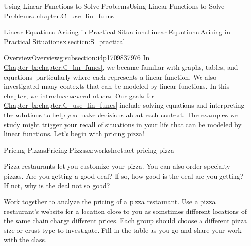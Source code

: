 \documentclass[oneside,10pt,]{book}
\newcommand{\xreffont}{\relax}
\numberwithin{equation}{chapter}
\begin{document}
\begin{chapterptx}{Using Linear Functions to Solve Problems}{}{Using Linear Functions to Solve Problems}{}{}{x:chapter:C_use_lin_funcs}
%
%
\typeout{************************************************}
\typeout{************************************************}
%
\begin{sectionptx}{Linear Equations Arising in Practical Situations}{}{Linear Equations Arising in Practical Situations}{}{}{x:section:S_practical}
%
%
\typeout{************************************************}
\typeout{************************************************}
%
\begin{subsectionptx}{Overview}{}{Overview}{}{}{g:subsection:idp1709837976}
In \hyperref[x:chapter:C_lin_funcs]{Chapter~{\xreffont\ref{x:chapter:C_lin_funcs}}}, we became familiar with graphs, tables, and equations, particularly where each represents a linear function. We also investigated many contexts that can be modeled by linear functions. In this chapter, we introduce several others. Our goals for \hyperref[x:chapter:C_use_lin_funcs]{Chapter~{\xreffont\ref{x:chapter:C_use_lin_funcs}}} include solving equations and interpreting the solutions to help you make decisions about each context. The examples we study might trigger your recall of situations in your life that can be modeled by linear functions. Let's begin with pricing pizza!%
\end{subsectionptx}
%
%
\typeout{************************************************}
\typeout{************************************************}
%
\begin{worksheet-subsection}{Pricing Pizzas}{}{Pricing Pizzas}{}{}{x:worksheet:act-pricing-pizza}
\begin{introduction}{}%
Pizza restaurants let you customize your pizza. You can also order specialty pizzas. Are you getting a good deal? If so, how good is the deal are you getting? If not, why is the deal not so good?%
\par
Work together to analyze the pricing of a pizza restaurant. Use a pizza restaurant's website for a location close to you as sometimes different locations of the same chain charge different prices. Each group should choose a different pizza size or crust type to investigate. Fill in the table as you go and share your work with the class.%
\end{introduction}%

\end{worksheet-subsection}
\end{sectionptx}
\end{chapterptx}
\end{document}
